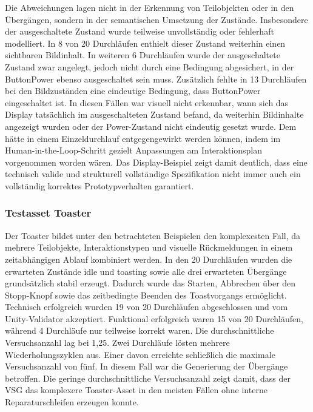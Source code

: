Die Abweichungen lagen nicht in der Erkennung von Teilobjekten oder in den Übergängen, sondern in der semantischen Umsetzung der Zustände. Insbesondere der ausgeschaltete Zustand wurde teilweise unvollständig oder fehlerhaft modelliert. In 8 von 20 Durchläufen enthielt dieser Zustand weiterhin einen sichtbaren Bildinhalt. In weiteren 6 Durchläufen wurde der ausgeschaltete Zustand zwar angelegt, jedoch nicht durch eine Bedingung abgesichert, in der ButtonPower ebenso ausgeschaltet sein muss. Zusätzlich fehlte in 13 Durchläufen bei den Bildzuständen eine eindeutige Bedingung, dass ButtonPower eingeschaltet ist. In diesen Fällen war visuell nicht erkennbar, wann sich das Display tatsächlich im ausgeschalteten Zustand befand, da weiterhin Bildinhalte angezeigt wurden oder der Power-Zustand nicht eindeutig gesetzt wurde. Dem hätte in einem Einzeldurchlauf entgegengewirkt werden können, indem im Human-in-the-Loop-Schritt gezielt Anpassungen am Interaktionsplan vorgenommen worden wären. Das Display-Beispiel zeigt damit deutlich, dass eine technisch valide und strukturell vollständige Spezifikation nicht immer auch ein vollständig korrektes Prototypverhalten garantiert.

\subsubsection*{Testasset Toaster}

Der Toaster bildet unter den betrachteten Beispielen den komplexesten Fall, da mehrere Teilobjekte, Interaktionstypen und visuelle Rückmeldungen in einem zeitabhängigen Ablauf kombiniert werden. In den 20 Durchläufen wurden die erwarteten Zustände idle und toasting sowie alle drei erwarteten Übergänge grundsätzlich stabil erzeugt. Dadurch wurde das Starten, Abbrechen über den Stopp-Knopf sowie das zeitbedingte Beenden des Toastvorgangs ermöglicht. Technisch erfolgreich wurden 19 von 20 Durchläufen abgeschlossen und vom Unity-Validator akzeptiert. Funktional erfolgreich waren 15 von 20 Durchläufen, während 4 Durchläufe nur teilweise korrekt waren. Die durchschnittliche Versuchsanzahl lag bei 1,25. Zwei Durchläufe lösten mehrere Wiederholungszyklen aus. Einer davon erreichte schließlich die maximale Versuchsanzahl von fünf. In diesem Fall war die Generierung der Übergänge betroffen. Die geringe durchschnittliche Versuchsanzahl zeigt damit, dass der VSG das komplexere Toaster-Asset in den meisten Fällen ohne interne Reparaturschleifen erzeugen konnte.

